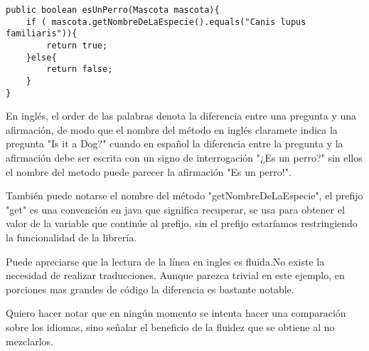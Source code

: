 \begin{lstlisting}
public boolean esUnPerro(Mascota mascota){
	if ( mascota.getNombreDeLaEspecie().equals("Canis lupus familiaris")){
		return true;
	}else{
		return false;
	}
}
\end{lstlisting}

	En inglés, el order de las palabras denota la diferencia entre una pregunta y una afirmación, de modo que el nombre del método en inglés claramete indica la pregunta "Is it a Dog?" cuando en español la diferencia entre la pregunta y la afirmación debe ser escrita con un signo de interrogación "¿Es un perro?" sin ellos el nombre del metodo puede parecer la afirmación "Es un perro!".

	También puede notarse el nombre del método "getNombreDeLaEspecie", el prefijo "get" es una convención en java que significa recuperar, se usa para obtener el valor de la variable que continúe al prefijo, sin el prefijo estaríamos restringiendo la funcionalidad de la librería.

	Puede apreciarse que la lectura de la línea en ingles es fluida.No existe la necesidad de realizar traducciones. Aunque parezca trivial en este ejemplo, en porciones mas grandes de código la diferencia es bastante notable.

	Quiero hacer notar que en ningún momento se intenta hacer una comparación sobre los idiomas, sino señalar el beneficio de la fluidez que se obtiene al no mezclarlos.